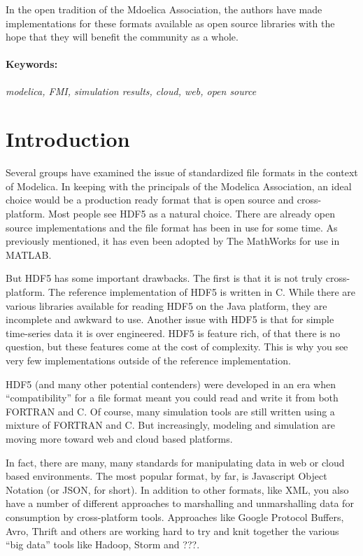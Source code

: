 \documentclass[11pt,a4paper,twocolumn]{article}
\begin{document}
In the open tradition of the Mdoelica Association, the authors have
made implementations for these formats available as open source
libraries with the hope that they will benefit the community as a
whole.

\paragraph{Keywords:}\emph{modelica, FMI, simulation results,
  cloud, web, open source}

\section{Introduction}
\label{sec:intro}

Several groups have examined the issue of standardized file formats
\cite{AndreasHDF5,GallHDF5} in the context of Modelica.  In keeping
with the principals of the Modelica Association, an ideal choice would
be a production ready format that is open source and cross-platform.
Most people see HDF5 as a natural choice.  There are already open
source implementations and the file format has been in use for some
time.  As previously mentioned, it has even been adopted by The
MathWorks for use in MATLAB.

But HDF5 has some important drawbacks.  The first is that it is not
truly cross-platform.  The reference implementation of HDF5 is written
in C.  While there are various libraries available for reading HDF5 on
the Java platform\cite{HDFJava}, they are incomplete and awkward to
use.  Another issue with HDF5 is that for simple time-series data it
is over engineered.  HDF5 is feature rich, of that there is no
question, but these features come at the cost of complexity.  This is
why you see very few implementations outside of the reference
implementation.

HDF5 (and many other potential contenders) were developed in an era
when ``compatibility'' for a file format meant you could read and
write it from both FORTRAN and C.  Of course, many simulation tools
are still written using a mixture of FORTRAN and C.  But increasingly,
modeling and simulation are moving more toward web and cloud based
platforms.

In fact, there are many, many standards for manipulating data in web
or cloud based environments.  The most popular format, by far, is
Javascript Object Notation (or JSON, for short).  In addition to other
formats, like XML, you also have a number of different approaches to
marshalling and unmarshalling data for consumption by cross-platform
tools.  Approaches like Google Protocol Buffers\cite{GPB},
Avro\cite{Avro}, Thrift\cite{Thrift} and others are working hard to
try and knit together the various ``big data'' tools like
Hadoop\cite{Hadoop}, Storm\cite{Storm} and ???.
\end{document}
